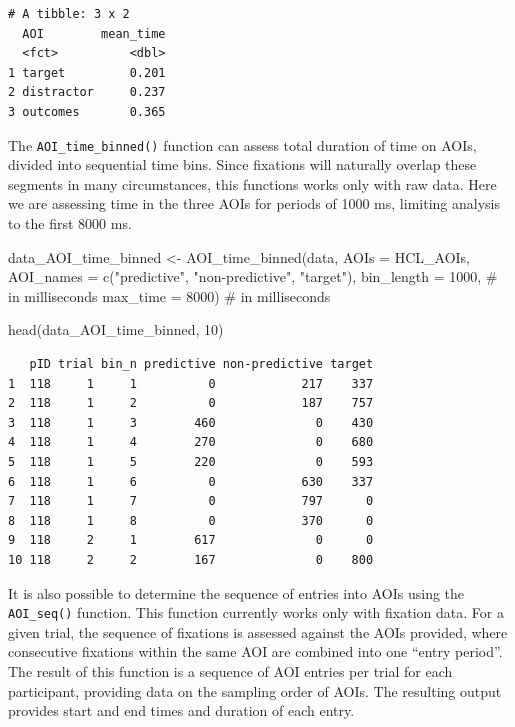 \documentclass[
  man,
  floatsintext,
  longtable,
  nolmodern,
  notxfonts,
  notimes,
  colorlinks=true,linkcolor=blue,citecolor=blue,urlcolor=blue]{apa7}
\newenvironment{Shaded}{\begin{snugshade}}{\end{snugshade}}
\newcommand{\AttributeTok}[1]{\textcolor[rgb]{0.40,0.45,0.13}{#1}}
\newcommand{\CommentTok}[1]{\textcolor[rgb]{0.37,0.37,0.37}{#1}}
\newcommand{\DecValTok}[1]{\textcolor[rgb]{0.68,0.00,0.00}{#1}}
\newcommand{\FunctionTok}[1]{\textcolor[rgb]{0.28,0.35,0.67}{#1}}
\newcommand{\NormalTok}[1]{\textcolor[rgb]{0.00,0.23,0.31}{#1}}
\newcommand{\OtherTok}[1]{\textcolor[rgb]{0.00,0.23,0.31}{#1}}
\newcommand{\StringTok}[1]{\textcolor[rgb]{0.13,0.47,0.30}{#1}}
\begin{document}
\begin{verbatim}
# A tibble: 3 x 2
  AOI        mean_time
  <fct>          <dbl>
1 target         0.201
2 distractor     0.237
3 outcomes       0.365
\end{verbatim}

The \texttt{AOI\_time\_binned()} function can assess total duration of
time on AOIs, divided into sequential time bins. Since fixations will
naturally overlap these segments in many circumstances, this functions
works only with raw data. Here we are assessing time in the three AOIs
for periods of 1000 ms, limiting analysis to the first 8000 ms.

\begin{Shaded}
\begin{Highlighting}[]
\NormalTok{data\_AOI\_time\_binned }\OtherTok{\textless{}{-}} 
  \FunctionTok{AOI\_time\_binned}\NormalTok{(data, }
                  \AttributeTok{AOIs =}\NormalTok{ HCL\_AOIs,}
                  \AttributeTok{AOI\_names =} \FunctionTok{c}\NormalTok{(}\StringTok{"predictive"}\NormalTok{, }\StringTok{"non{-}predictive"}\NormalTok{, }\StringTok{"target"}\NormalTok{),}
                  \AttributeTok{bin\_length =} \DecValTok{1000}\NormalTok{, }\CommentTok{\# in milliseconds}
                  \AttributeTok{max\_time =} \DecValTok{8000}\NormalTok{) }\CommentTok{\# in milliseconds}

\FunctionTok{head}\NormalTok{(data\_AOI\_time\_binned, }\DecValTok{10}\NormalTok{)}
\end{Highlighting}
\end{Shaded}

\begin{verbatim}
   pID trial bin_n predictive non-predictive target
1  118     1     1          0            217    337
2  118     1     2          0            187    757
3  118     1     3        460              0    430
4  118     1     4        270              0    680
5  118     1     5        220              0    593
6  118     1     6          0            630    337
7  118     1     7          0            797      0
8  118     1     8          0            370      0
9  118     2     1        617              0      0
10 118     2     2        167              0    800
\end{verbatim}

It is also possible to determine the sequence of entries into AOIs using
the \texttt{AOI\_seq()} function. This function currently works only
with fixation data. For a given trial, the sequence of fixations is
assessed against the AOIs provided, where consecutive fixations within
the same AOI are combined into one ``entry period''. The result of this
function is a sequence of AOI entries per trial for each participant,
providing data on the sampling order of AOIs. The resulting output
provides start and end times and duration of each entry.
\end{document}
